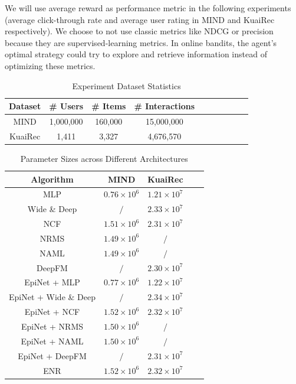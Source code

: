 We will use average reward as performance metric in the following experiments (average click-through rate and average user rating in MIND and KuaiRec respectively). We choose to not use classic metrics like NDCG or precision because they are supervised-learning metrics. In online bandits, the agent’s optimal strategy could try to explore and retrieve information instead of optimizing these metrics.  

\begin{table}[t!]
\small
    \centering
  \caption{Experiment Dataset Statistics}
  \vspace{-0.1in}
  \label{tab:stats}
  \begin{tabular}{cccccccccc}
    \toprule
    Dataset & \# Users & \# Items & \# Interactions\\
    \midrule
    MIND \cite{wu2020mind} & 1,000,000 & 160,000 & 15,000,000\\
    KuaiRec \cite{gao2022kuairec} & 1,411 & 3,327 & 4,676,570\\
  \bottomrule
\end{tabular}
\end{table}

\begin{table}[t!]
\small
  \caption{Parameter Sizes across Different Architectures}
  \vspace{-0.1in}
  \label{tab:param}
  \begin{tabular}{ccccc}
    \toprule
    Algorithm & MIND & KuaiRec\\
    \midrule 
    MLP & $0.76 \times 10^6$ & $1.21 \times 10^7$\\
    Wide \& Deep & $/$ & $2.33 \times 10^7$\\
    NCF & $1.51 \times 10^6$ & $2.31 \times 10^7$\\
    NRMS & $1.49 \times 10^6$ & $/$\\ 
    NAML & $1.49 \times 10^6$ & $/$\\
    DeepFM & $/$ & $2.30 \times 10^7$ \\
    EpiNet + MLP & $0.77 \times 10^6$ & $1.22 \times 10^7$\\
    EpiNet + Wide \& Deep & $/$ & $2.34 \times 10^7$\\
    EpiNet + NCF & $1.52 \times 10^6$ & $2.32 \times 10^7$\\
    EpiNet + NRMS & $1.50 \times 10^6$ & $/$ \\
    EpiNet + NAML & $1.50 \times 10^6$ & $/$\\
    EpiNet + DeepFM & $/$ & $2.31 \times 10^7$ \\
    ENR & $1.52 \times 10^6$ & $2.32 \times 10^7$ \\
  \bottomrule
\end{tabular}
\vspace{-0.15in}
\end{table}

